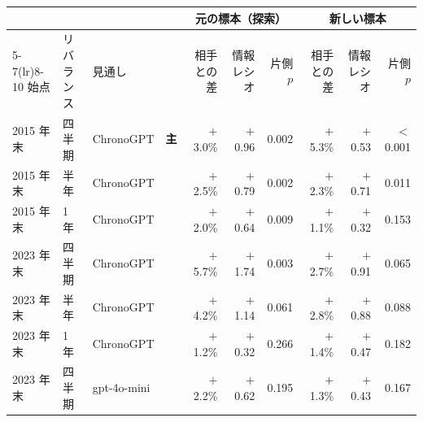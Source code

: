 \begin{tabular}{@{}llll rrr rrr@{}}
\toprule
 & & & & \multicolumn{3}{c}{元の標本（探索）} & \multicolumn{3}{c}{新しい標本} \\
\cmidrule(lr){5-7}\cmidrule(lr){8-10}
始点 & リバランス & 見通し & & 相手との差 & 情報レシオ & 片側 $p$ & 相手との差 & 情報レシオ & 片側 $p$ \\
\midrule
2015 年末 & 四半期 & ChronoGPT & \textbf{主} & $+$3.0\% & $+$0.96 & 0.002 & $+$5.3\% & $+$0.53 & $<$0.001 \\
2015 年末 & 半年 & ChronoGPT &  & $+$2.5\% & $+$0.79 & 0.002 & $+$2.3\% & $+$0.71 & 0.011 \\
2015 年末 & 1 年 & ChronoGPT &  & $+$2.0\% & $+$0.64 & 0.009 & $+$1.1\% & $+$0.32 & 0.153 \\
2023 年末 & 四半期 & ChronoGPT &  & $+$5.7\% & $+$1.74 & 0.003 & $+$2.7\% & $+$0.91 & 0.065 \\
2023 年末 & 半年 & ChronoGPT &  & $+$4.2\% & $+$1.14 & 0.061 & $+$2.8\% & $+$0.88 & 0.088 \\
2023 年末 & 1 年 & ChronoGPT &  & $+$1.2\% & $+$0.32 & 0.266 & $+$1.4\% & $+$0.47 & 0.182 \\
2023 年末 & 四半期 & gpt-4o-mini &  & $+$2.2\% & $+$0.62 & 0.195 & $+$1.3\% & $+$0.43 & 0.167 \\
\bottomrule
\end{tabular}
